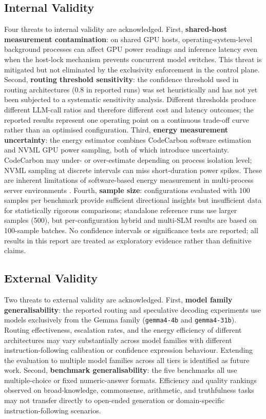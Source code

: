 \subsection{Internal Validity}

Four threats to internal validity are acknowledged. First, \textbf{shared-host measurement contamination}: on shared GPU hosts, operating-system-level background processes can affect GPU power readings and inference latency even when the host-lock mechanism prevents concurrent model switches. This threat is mitigated but not eliminated by the exclusivity enforcement in the control plane. Second, \textbf{routing threshold sensitivity}: the confidence threshold used in routing architectures (0.8 in reported runs) was set heuristically and has not yet been subjected to a systematic sensitivity analysis. Different thresholds produce different LLM-call ratios and therefore different cost and latency outcomes; the reported results represent one operating point on a continuous trade-off curve rather than an optimised configuration. Third, \textbf{energy measurement uncertainty}: the energy estimator combines CodeCarbon software estimation and NVML GPU power sampling, both of which introduce uncertainty. CodeCarbon may under- or over-estimate depending on process isolation level; NVML sampling at discrete intervals can miss short-duration power spikes. These are inherent limitations of software-based energy measurement in multi-process server environments \cite{energytoken2025}. Fourth, \textbf{sample size}: configurations evaluated with 100 samples per benchmark provide sufficient directional insights but insufficient data for statistically rigorous comparisons; standalone reference runs use larger samples (500), but per-configuration hybrid and multi-SLM results are based on 100-sample batches. No confidence intervals or significance tests are reported; all results in this report are treated as exploratory evidence rather than definitive claims.

\subsection{External Validity}

Two threats to external validity are acknowledged. First, \textbf{model family generalisability}: the reported routing and speculative decoding experiments use models exclusively from the Gemma family (\texttt{gemma4-4b} and \texttt{gemma4-31b}). Routing effectiveness, escalation rates, and the energy efficiency of different architectures may vary substantially across model families with different instruction-following calibration or confidence expression behaviour. Extending the evaluation to multiple model families across all tiers is identified as future work. Second, \textbf{benchmark generalisability}: the five benchmarks all use multiple-choice or fixed numeric-answer formats. Efficiency and quality rankings observed on broad-knowledge, commonsense, arithmetic, and truthfulness tasks may not transfer directly to open-ended generation or domain-specific instruction-following scenarios.


